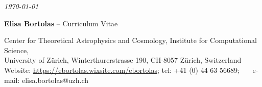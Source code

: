 
\vspace*{-1.6cm}
\begin{flushright}
{ \it \today \ \ \ \ \ \  }
\end{flushright}


\begin{center}
\begin{Large}
{\color{color} {\bf Elisa Bortolas} } -- Curriculum Vitae
\end{Large}

\vspace{0.17cm}
Center for Theoretical Astrophysics and Cosmology, Institute for Computational Science, \\ University of Z\"urich, Winterthurerstrasse
190, CH-8057 Z\"urich, Switzerland\\
Website: { \href{https://ebortolas.wixsite.com/ebortolas}{https://ebortolas.wixsite.com/ebortolas}}; tel: +41 (0) 44 63 56689; \ \ \  e-mail: elisa.bortolas@uzh.ch
\end{center}

\vspace{0.17cm}
